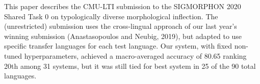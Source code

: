 This paper describes the CMU-LTI submission to the SIGMORPHON 2020 Shared Task 0 on typologically diverse morphological inflection. The (unrestricted) submission uses the cross-lingual approach of our last year's winning submission (Anastasopoulos and Neubig, 2019), but adapted to use specific transfer languages for each test language. Our system, with fixed non-tuned hyperparameters, achieved a macro-averaged accuracy of 80.65 ranking 20th among 31 systems, but it was still tied for best system in 25 of the 90 total languages.
